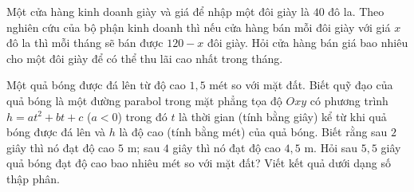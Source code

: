 \begin{bt}%
	 Một cửa hàng kinh doanh giày và giá để nhập một đôi giày là $40$ đô la. Theo nghiên cứu của bộ phận kinh doanh thì nếu cửa hàng bán mỗi đôi giày với giá $x$ đô la thì mỗi tháng sẽ bán được $120-x$ đôi giày. Hỏi cửa hàng bán giá bao nhiêu cho một đôi giày để có thể thu lãi cao nhất trong tháng.
\end{bt}

\begin{bt}%
	Một quả bóng được đá lên từ độ cao $1{,}5$ mét so với mặt đất. Biết quỹ đạo  của quả bóng là một đường parabol trong mặt phẳng tọa độ $Oxy$ có phương trình $h=at^2+bt+c$ ($a<0$) trong đó $t$ là thời gian (tính bằng giây) kể từ khi quả bóng được đá lên và $h$ là độ cao (tính bằng mét) của quả bóng. Biết rằng sau $2$ giây thì nó đạt độ cao $5$ m; sau $4$ giây thì nó đạt độ cao $4{,}5$ m. Hỏi sau $5{,}5$ giây quả bóng đạt độ cao bao nhiêu mét so với mặt đất? Viết kết quả dưới dạng số thập phân.
\end{bt}

